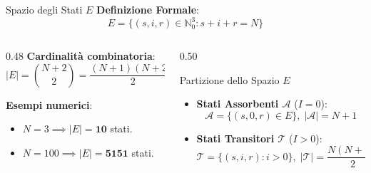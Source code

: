 \documentclass[10pt, aspectratio=169]{beamer}
\begin{document}
\begin{frame}{Spazio degli Stati $E$}
    \textbf{Definizione Formale}:
    \[ E = \bigl\{(s, i, r) \in \mathbb{N}_0^3 : s + i + r = N\bigr\} \]

    \begin{columns}[T]
        \begin{column}{0.48\textwidth}
            \textbf{Cardinalità combinatoria}:
            \[ |E| = \binom{N+2}{2} = \frac{(N+1)(N+2)}{2} \]
            
            \textbf{Esempi numerici}:
            \begin{itemize}
                \item $N = 3 \implies |E| = \mathbf{10}$ stati.
                \item $N = 100 \implies |E| = \mathbf{5151}$ stati.
            \end{itemize}
        \end{column}
        \begin{column}{0.50\textwidth}
            \begin{block}{Partizione dello Spazio $E$}
                \begin{itemize}
                    \item \textbf{Stati Assorbenti $\mathcal{A}$} ($I=0$):
                    \[ \mathcal{A} = \{(s, 0, r) \in E\}, \; |\mathcal{A}| = N+1 \]
                    \item \textbf{Stati Transitori $\mathcal{T}$} ($I>0$):
                    \[ \mathcal{T} = \{(s, i, r) : i>0\}, \; |\mathcal{T}| = \frac{N(N+1)}{2} \]
                \end{itemize}
            \end{block}
        \end{column}
    \end{columns}

\end{frame}
\end{document}
